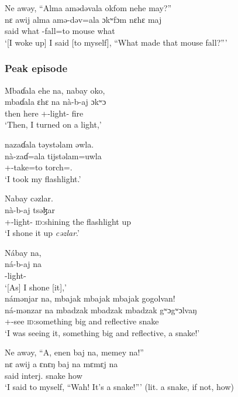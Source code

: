 \largerpage
\ea
 Ne awəy,  “Alma  {amədəvala}  okfom  nehe  may?”\\
\gll nɛ awij    alma   amə-dəv=ala ɔkʷfɔm   nɛhɛ    maj\\
{\oneS} said     what   {\DEP}-fall=to     mouse    {\DEM}  what \\
\glt ‘[I woke up]  I said [to myself], “What made that mouse fall?”’
\z

\subsubsection*{Peak episode}
\ea 
 Mbaɗala  ehe  na, nabay  oko,\\
\gll mbaɗala   ɛhɛ   na nà-b-aj  ɔkʷɔ\\
 then       here   {\PSP}  {\oneS}+{\PFV}-light{}-{\CL}      fire\\
\glt ‘Then, I turned on a light,’
\z

\ea 
 nazaɗala  təystəlam  əwla.\\
\gll nà-zaɗ=ala tijstəlam=uwla\\
{\oneS}+{\PFV}-take=to     torch={\oneS}.{\POSS}\\
\glt ‘I took my flashlight.’
\z 

\ea 
Nabay  cəzlar.\\
\gll nà-b-aj tsəɮar\\
{\oneS}+{\PFV}-light{}-{\CL}       {\textsc{id}:shining the flashlight up}\\
\glt ‘I shone it up \textit{cəzlar}.’
\z

\ea   Nábay  na,\\
\gll ná-b-aj     na\\ 
{\oneS}-light{}-{\CL}  {\PSP}\\
\glt ‘[As] I shone [it],’\\

\medskip
 námənjar  na,  {mbajak  mbajak  mbajak}  gogolvan!\\
\gll ná-mənzar     na     {mbadzak   mbadzak    mbadzak}  gʷɔgʷɔlvaŋ\\
{\oneS}+{\IFV}-see  {\PSP}    {\textsc{id}:something big and reflective}   snake\\
\glt ‘I was seeing it, something big and reflective, a snake!’
\z

\ea  Ne  awəy,    “A,  enen  baj  na,  memey  na!”\\
\gll nɛ awij    a          ɛnɛŋ       baj     na  mɛmɛj   na\\
{\oneS} said    interj.   snake  {\NEG}   {\PSP}  how       {\PSP}\\
\glt ‘I said to myself, “Wah! It’s a snake!”’ (lit. a snake, if not, how)
\z

